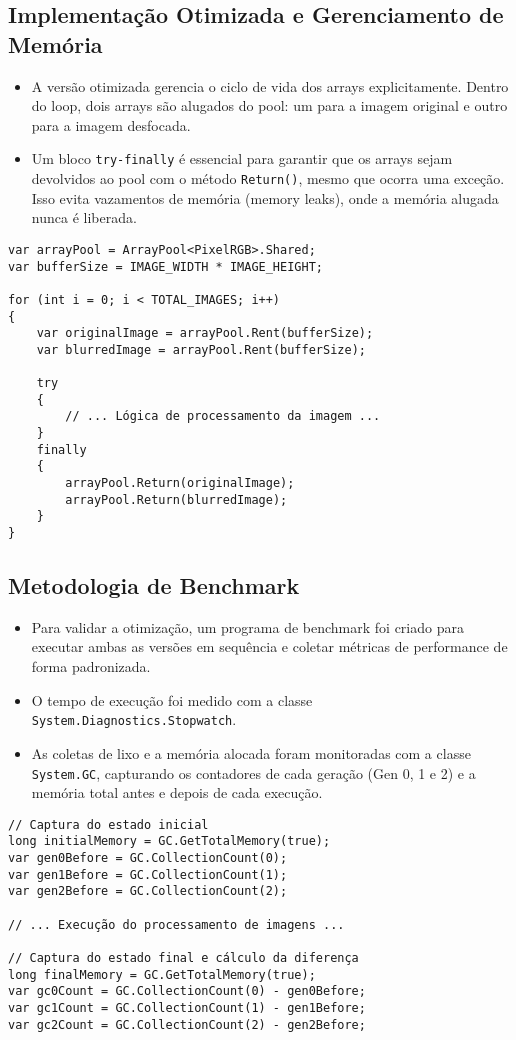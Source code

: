 \documentclass[
	12pt,
	oneside,
	a4paper,
	english,
	brazil,
]{abntex2}
\begin{document}
\subsection{Implementação Otimizada e Gerenciamento de Memória}
\begin{itemize}
    \item A versão otimizada gerencia o ciclo de vida dos arrays explicitamente. Dentro do loop, dois arrays são alugados do pool: um para a imagem original e outro para a imagem desfocada.
    \item Um bloco \texttt{try-finally} é essencial para garantir que os arrays sejam devolvidos ao pool com o método \texttt{Return()}, mesmo que ocorra uma exceção. Isso evita vazamentos de memória (memory leaks), onde a memória alugada nunca é liberada.
\end{itemize}

\begin{lstlisting}[caption={Ciclo de aluguel e devolução de arrays com ArrayPool.}]
var arrayPool = ArrayPool<PixelRGB>.Shared;
var bufferSize = IMAGE_WIDTH * IMAGE_HEIGHT;

for (int i = 0; i < TOTAL_IMAGES; i++)
{
    var originalImage = arrayPool.Rent(bufferSize);
    var blurredImage = arrayPool.Rent(bufferSize);

    try
    {
        // ... Lógica de processamento da imagem ...
    }
    finally
    {
        arrayPool.Return(originalImage);
        arrayPool.Return(blurredImage);
    }
}
\end{lstlisting}

\subsection{Metodologia de Benchmark}
\begin{itemize}
    \item Para validar a otimização, um programa de benchmark foi criado para executar ambas as versões em sequência e coletar métricas de performance de forma padronizada.
    \item O tempo de execução foi medido com a classe \texttt{System.Diagnostics.Stopwatch}.
    \item As coletas de lixo e a memória alocada foram monitoradas com a classe \texttt{System.GC}, capturando os contadores de cada geração (Gen 0, 1 e 2) e a memória total antes e depois de cada execução.
\end{itemize}

\begin{lstlisting}[caption={Coleta de métricas de GC para análise.}]
// Captura do estado inicial
long initialMemory = GC.GetTotalMemory(true);
var gen0Before = GC.CollectionCount(0);
var gen1Before = GC.CollectionCount(1);
var gen2Before = GC.CollectionCount(2);

// ... Execução do processamento de imagens ...

// Captura do estado final e cálculo da diferença
long finalMemory = GC.GetTotalMemory(true);
var gc0Count = GC.CollectionCount(0) - gen0Before;
var gc1Count = GC.CollectionCount(1) - gen1Before;
var gc2Count = GC.CollectionCount(2) - gen2Before;
\end{lstlisting}
\end{document}
